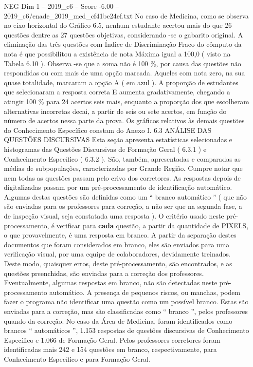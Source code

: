 \begin{textsample}{NEG Dim 1 – 2019\_c6 – Score -6.00 – 2019\_c6/enade\_2019\_med\_cf41be24ef.txt}
No caso de Medicina, como se observa no eixo horizontal do Gráfico 6.5, nenhum estudante acertou mais do que 26 questões dentre as 27 questões objetivas, considerando -se o gabarito original.
A eliminação das três questões com Índice de Discriminação Fraco do cômputo da nota é que possibilitou a existência de nota Máxima igual a 100,0 ( visto na Tabela 6.10 ).
Observa -se que a soma não é 100 \%, por causa das questões não respondidas ou com mais de uma opção marcada.
Aqueles com nota zero, na sua quase totalidade, marcaram a opção A ( em azul ).
A proporção de estudantes que selecionaram a resposta correta E aumenta gradativamente, chegando a atingir 100 \% para 24 acertos seis mais, enquanto a proporção dos que escolheram alternativas incorretas decai, a partir de seis ou sete acertos, em função do número de acertos nessa parte da prova.
Os gráficos relativos às demais questões do Conhecimento Específico constam do Anexo I. 6.3 ANÁLISE DAS QUESTÕES DISCURSIVAS Esta seção apresenta estatísticas selecionadas e histogramas das Questões Discursivas de Formação Geral ( 6.3.1 ) e Conhecimento Específico ( 6.3.2 ).
São, também, apresentadas e comparadas as médias de subpopulações, caracterizadas por Grande Região.
Cumpre notar que nem todas as questões passam pelo crivo dos corretores.
As respostas depois de digitalizadas passam por um pré-processamento de identificação automático.
Algumas destas questões são definidas como um “ branco automático ” ( que não são enviadas para os professores para correção, a não ser que na segunda fase, a de inspeção visual, seja constatada uma resposta ).
O critério usado neste pré-processamento, é verificar para \textbf{cada} questão, a partir da quantidade de PIXELS, o que provavelmente, é uma resposta em branco.
A partir da separação destes documentos que foram considerados em branco, eles são enviados para uma verificação visual, por uma equipe de colaboradores, devidamente treinados.
Deste modo, quaisquer erros, deste pré-processamento, são encontrados, e as questões preenchidas, são enviadas para a correção dos professores.
Eventualmente, algumas respostas em branco, não são detectadas neste pré-processamento automático.
A presença de pequenos riscos, ou manchas, podem fazer o programa não identificar uma questão como um possível branco.
Estas são enviadas para a correção, mas são classificadas como “ branco ”, pelos professores quando da correção.
No caso da Área de Medicina, foram identificados como brancos “ automáticos ”, 1.153 respostas de questões discursivas de Conhecimento Específico e 1.066 de Formação Geral.
Pelos professores corretores foram identificadas mais 242 e 154 questões em branco, respectivamente, para Conhecimento Específico e para Formação Geral.

\end{textsample}
